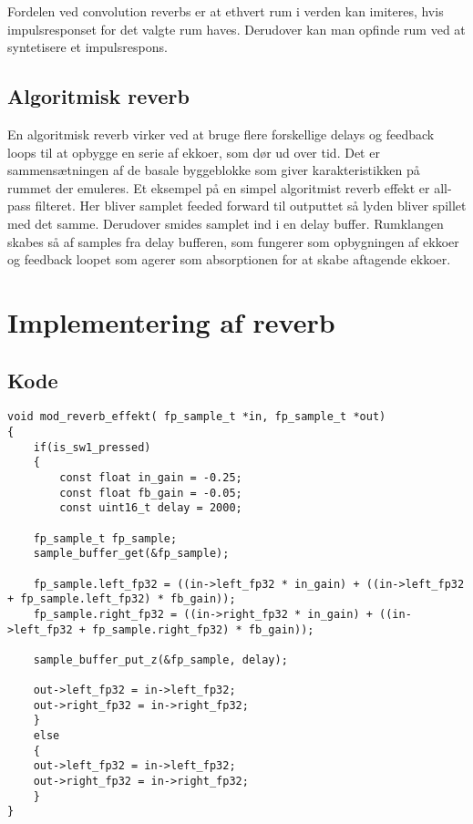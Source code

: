 Fordelen ved convolution reverbs er at ethvert rum i verden kan imiteres, hvis impulsresponset for det valgte rum haves.\newline
Derudover kan man opfinde rum ved at syntetisere et impulsrespons.

\subsection{Algoritmisk reverb}
En algoritmisk reverb virker ved at bruge flere forskellige delays og feedback loops til at opbygge en serie af ekkoer, som dør ud over tid.
Det er sammensætningen af de basale byggeblokke som giver karakteristikken på rummet der emuleres.\newline
Et eksempel på en simpel algoritmist reverb effekt er all-pass filteret.
Her bliver samplet feeded forward til outputtet så lyden bliver spillet med det samme.
Derudover smides samplet ind i en delay buffer.
Rumklangen skabes så af samples fra delay bufferen, som fungerer som opbygningen af ekkoer og feedback loopet som agerer som absorptionen for at skabe aftagende ekkoer.





\section{Implementering af reverb}
\subsection{Kode}
\begin{lstlisting}
void mod_reverb_effekt( fp_sample_t *in, fp_sample_t *out)
{
	if(is_sw1_pressed)
	{
		const float in_gain = -0.25;
		const float fb_gain = -0.05;
		const uint16_t delay = 2000;

	fp_sample_t fp_sample;
	sample_buffer_get(&fp_sample);

	fp_sample.left_fp32 = ((in->left_fp32 * in_gain) + ((in->left_fp32 + fp_sample.left_fp32) * fb_gain));
	fp_sample.right_fp32 = ((in->right_fp32 * in_gain) + ((in->left_fp32 + fp_sample.right_fp32) * fb_gain));

	sample_buffer_put_z(&fp_sample, delay);

	out->left_fp32 = in->left_fp32;
	out->right_fp32 = in->right_fp32;
	}
	else
	{
	out->left_fp32 = in->left_fp32;
	out->right_fp32 = in->right_fp32;
	}
}
\end{lstlisting}

